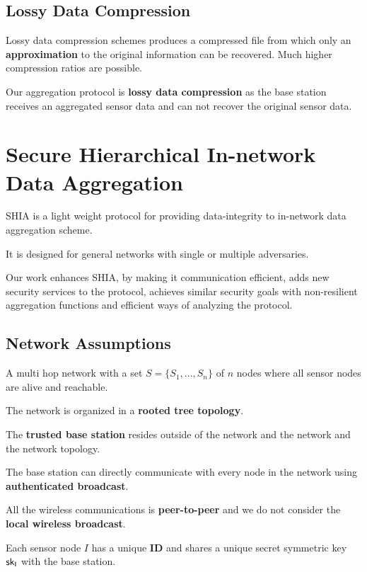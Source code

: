 \documentclass[%
  slidesonly,%
  semlayer%
  ]{seminar}                                  %
\begin{document}
\begin{slide}

  \subsection*{Lossy Data Compression}
    Lossy data compression schemes produces a compressed file from which only an \textbf{approximation} to the original information can be recovered. Much higher compression ratios are possible.

    Our aggregation protocol is \textbf{lossy data compression} as the base station receives an aggregated sensor data and can not recover the original sensor data.

    \clearpage

\section*{Secure Hierarchical In-network Data Aggregation}
    
    SHIA is a light weight protocol for providing data-integrity to in-network data aggregation scheme.
    
    It is designed for general networks with single or multiple adversaries.
    
    Our work enhances SHIA, by making it communication efficient, adds new security services to the protocol, achieves similar security goals with non-resilient aggregation functions and efficient ways of analyzing the protocol.
  
    \clearpage

    \subsection*{Network Assumptions}
      A multi hop network with a set $ S = \{S_{1},...,S_{n}\} $ of $n$ nodes where all sensor nodes are alive and reachable. 

      The network is organized in a \textbf{rooted tree topology}.

      The \textbf{trusted base station} resides outside of the network and the network and the network topology. 

      The base station can directly communicate with every node in the network using \textbf{authenticated broadcast}.

      All the wireless communications is \textbf{peer-to-peer} and we do not consider the \textbf{local wireless broadcast}.

      Each sensor node $I$ has a unique \textbf{ID} and shares a unique secret symmetric key $\sf{sk}_{I}$ with the base station.


\end{slide}
\end{document}
